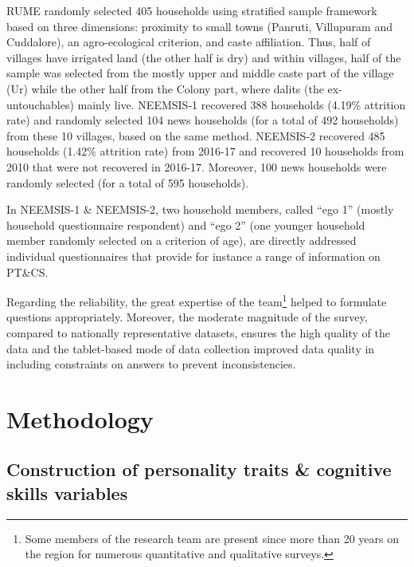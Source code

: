 \documentclass[a4paper, 12pt, onecolumn]{article}
\newcommand{\PTCS}{PT\&CS}
\begin{document}
RUME randomly selected 405 households using stratified sample framework based on three dimensions: proximity to small towns (Panruti, Villupuram and Cuddalore), an agro-ecological criterion, and caste affiliation.
Thus, half of villages have irrigated land (the other half is dry) and within villages, half of the sample was selected from the mostly upper and middle caste part of the village (Ur) while the other half from the Colony part, where dalits (the ex-untouchables) mainly live. 
NEEMSIS-1 recovered 388 households (4.19\% attrition rate) and randomly selected 104 news households (for a total of 492 households) from these 10 villages, based on the same method. 
NEEMSIS-2 recovered 485 households (1.42\% attrition rate) from 2016-17 and recovered 10 households from 2010 that were not recovered in 2016-17.
Moreover, 100 news households were randomly selected (for a total of 595 households).

In NEEMSIS-1 \& NEEMSIS-2, two household members, called ``ego 1'' (mostly household questionnaire respondent) and ``ego 2'' (one younger household member randomly selected on a criterion of age), are directly addressed individual questionnaires that provide for instance a range of information on \PTCS.

Regarding the reliability, the great expertise of the team\footnote{Some members of the research team are present since more than 20 years on the region for numerous quantitative and qualitative surveys.} helped to formulate questions appropriately.
Moreover, the moderate magnitude of the survey, compared to nationally representative datasets, ensures the high quality of the data and the tablet-based mode of data collection improved data quality in including constraints on answers to prevent inconsistencies. 


\clearpage
\newpage
\section{Methodology}

	\subsection{Construction of personality traits \& cognitive skills variables }
\end{document}
